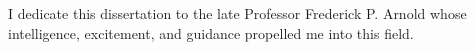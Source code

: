 \addvspace{4.25in}
\begin{center}
I dedicate this dissertation to the late Professor Frederick P. Arnold whose
intelligence, excitement, and guidance propelled me into this field.
\end{center}
